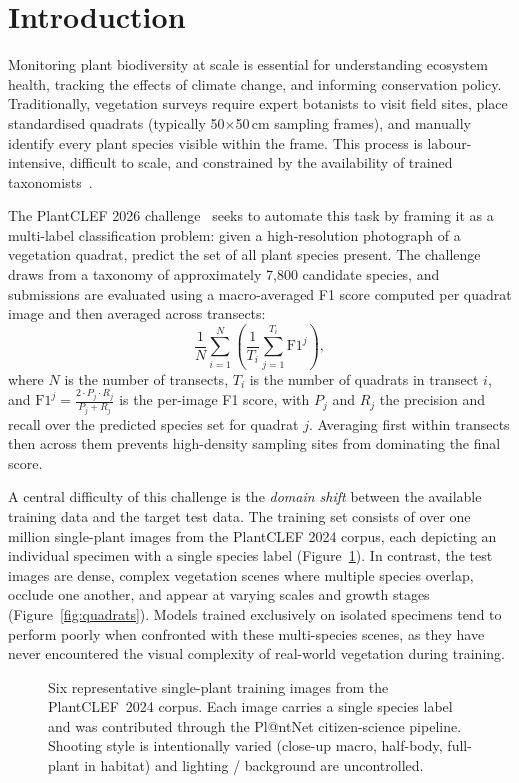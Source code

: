 \section{Introduction}
\label{sec:introduction}

Monitoring plant biodiversity at scale is essential for understanding ecosystem health, tracking the effects of climate change, and informing conservation policy. Traditionally, vegetation surveys require expert botanists to visit field sites, place standardised quadrats (typically 50$\times$50\,cm sampling frames), and manually identify every plant species visible within the frame. This process is labour-intensive, difficult to scale, and constrained by the availability of trained taxonomists~\cite{lifeclef2026}.

The PlantCLEF 2026 challenge~\cite{plantclef2026, lifeclef2026} seeks to automate this task by framing it as a multi-label classification problem: given a high-resolution photograph of a vegetation quadrat, predict the set of all plant species present. The challenge draws from a taxonomy of approximately 7,800 candidate species, and submissions are evaluated using a macro-averaged F1 score computed 
per quadrat image and then averaged across transects:
\[
  \frac{1}{N}\sum_{i=1}^{N}\!\left(\frac{1}{T_i}
  \sum_{j=1}^{T_i}\mathrm{F1}^{j}\right),
\]
where $N$ is the number of transects, $T_i$ is the number of quadrats 
in transect $i$, and $\mathrm{F1}^{j} = \frac{2 \cdot P_j \cdot R_j}{P_j + R_j}$ 
is the per-image F1 score, with $P_j$ and $R_j$ the precision and 
recall over the predicted species set for quadrat $j$. Averaging first 
within transects then across them prevents high-density sampling sites 
from dominating the final score.

A central difficulty of this challenge is the \emph{domain shift} between the available training data and the target test data. The training set consists of over one million single-plant images from the PlantCLEF 2024 corpus, each depicting an individual specimen with a single species label (Figure~\ref{fig:train_grid}). In contrast, the test images are dense, complex vegetation scenes where multiple species overlap, occlude one another, and appear at varying scales and growth stages (Figure~\ref{fig:quadrats}). Models trained exclusively on isolated specimens tend to perform poorly when confronted with these multi-species scenes, as they have never encountered the visual complexity of real-world vegetation during training.

\begin{figure}[h]
  \centering
  \resizebox{0.92\linewidth}{!}{}
  \caption{Six representative single-plant training images from the PlantCLEF~2024 corpus. Each image carries a single species label and was contributed through the Pl@ntNet citizen-science pipeline. Shooting style is intentionally varied (close-up macro, half-body, full-plant in habitat) and lighting / background are uncontrolled.}
  \label{fig:train_grid}
\end{figure}

